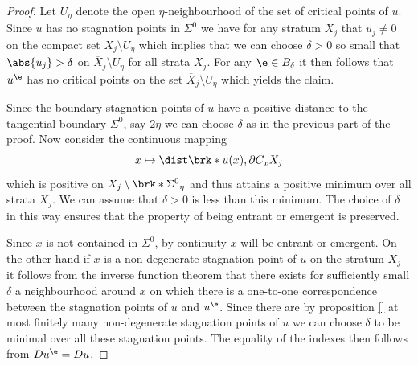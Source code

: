 \begin{proof}
  Let $U_\eta$ denote the open $\eta$-neighbourhood of the set of critical points of $u$.
  Since $u$ has no stagnation points in $\Sigma^0$ we have for any stratum $X_j$ that
  $u_j\neq0$ on the compact set $\overline{X}_j\setminus U_\eta$ which implies that we can choose $\delta>0$ 
  so small that $\abs{u_j}>\delta$ on $\overline{X}_j\setminus U_\eta$
  for all strata $X_j$.
  For any $\e\in B_\delta$ it then follows that $u^\e$ has no critical points on the set $\overline{X}_j\setminus U_\eta$
  which yields the claim.

  Since the boundary stagnation points of $u$ have a positive distance to the tangential boundary $\Sigma^0$,
  say $2\eta$ we can choose $\delta$ as in the previous part of the proof. Now consider the continuous mapping
  \begin{align*}
    x\mapsto \dist\brk*{u(x),\partial C_xX_j}
  \end{align*}
  which is positive on $X_j\setminus \brk*{\Sigma^0}_\eta$ and thus attains a positive minimum over all strata $X_j$.
  We can assume that $\delta>0$ is less than this minimum.
  The choice of $\delta$ in this way ensures that the property of being entrant or emergent is preserved.

  Since $x$ is not contained in $\Sigma^0$, by continuity $x$ will
  be entrant or emergent.
  On the other hand if $x$ is a non-degenerate stagnation point of $u$ on the stratum $X_j$ it follows 
  from the inverse function theorem that there exists for sufficiently small $\delta$
  a neighbourhood around $x$ on which there is a one-to-one correspondence between the
  stagnation points of $u$ and $u^\e$.
  Since there are by proposition \ref{} at most finitely many non-degenerate stagnation points of
  $u$ we can choose $\delta$ to be minimal over all these stagnation points.
  The equality of the indexes then follows from $Du^\e=Du$.

\end{proof}


